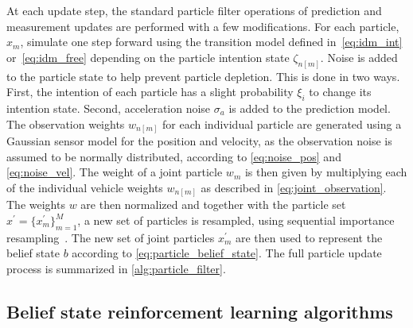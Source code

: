 At each update step, the standard particle filter operations of prediction and measurement updates are performed with a few modifications. 
For each particle, $x_m$, simulate one step forward using the transition model defined in~\eqref{eq:idm_int} or~\eqref{eq:idm_free} depending on the particle intention state $\zeta_{n[m]}$. 
Noise is added to the particle state to help prevent particle depletion. This is done in two ways.  
First, the intention of each particle has a slight probability $\xi_i$ to change its intention state. 
Second, acceleration noise $\sigma_a$ is added to the prediction model. 
The observation weights $w_{n[m]}$ for each individual particle are generated using a Gaussian sensor model for the position and velocity, as the observation noise is assumed to be normally distributed, according to \eqref{eq:noise_pos} and \eqref{eq:noise_vel}. The weight of a joint particle $w_{m}$ is then given by multiplying each of the individual vehicle weights $w_{n[m]}$ as described in \ref{eq:joint_observation}. 
The weights $w$ are then normalized and together with the particle set $x^\prime = \{x^\prime_{m}\}^M_{m=1}$, a new set of particles is resampled, using sequential importance resampling~\cite{gordon1993}. 
The new set of joint particles $x^\prime_m$ are then used to represent the belief state $b$ according to \eqref{eq:particle_belief_state}. The full particle update process is summarized in \ref{alg:particle_filter}.

\subsection{Belief state reinforcement learning algorithms}
\label{sec:belief_rl_algo}
%         
        
